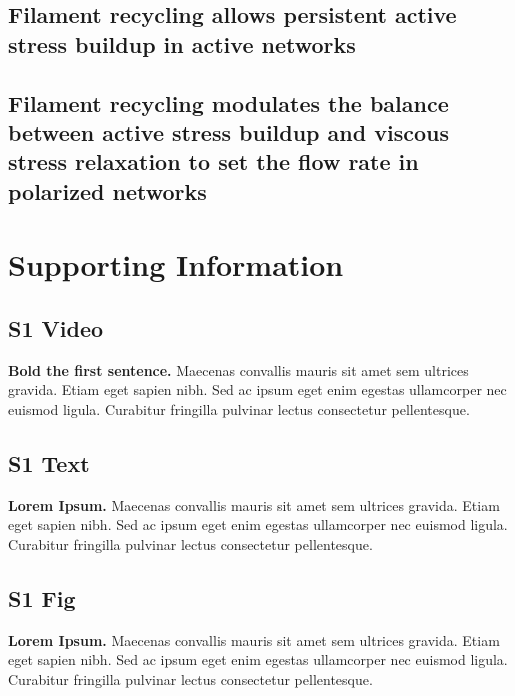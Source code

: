 \documentclass[10pt,letterpaper]{article}
\begin{document}
\subsection*{Filament recycling allows persistent active stress buildup in active networks}

\subsection*{Filament recycling modulates the balance between active stress buildup and viscous stress relaxation to set the flow rate in polarized networks}











\section*{Supporting Information}

\subsection*{S1 Video}
\label{S1_Video}
{\bf Bold the first sentence.}  Maecenas convallis mauris sit amet sem ultrices gravida. Etiam eget sapien nibh. Sed ac ipsum eget enim egestas ullamcorper nec euismod ligula. Curabitur fringilla pulvinar lectus consectetur pellentesque.

\subsection*{S1 Text}
\label{S1_Text}
{\bf Lorem Ipsum.} Maecenas convallis mauris sit amet sem ultrices gravida. Etiam eget sapien nibh. Sed ac ipsum eget enim egestas ullamcorper nec euismod ligula. Curabitur fringilla pulvinar lectus consectetur pellentesque.

\subsection*{S1 Fig}
\label{S1_Fig}
{\bf Lorem Ipsum.} Maecenas convallis mauris sit amet sem ultrices gravida. Etiam eget sapien nibh. Sed ac ipsum eget enim egestas ullamcorper nec euismod ligula. Curabitur fringilla pulvinar lectus consectetur pellentesque.
\end{document}
